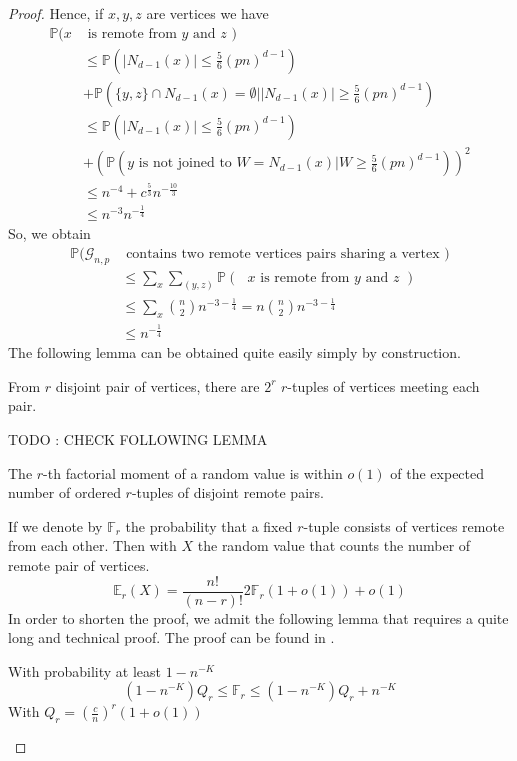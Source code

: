 \begin{proof}
	Hence, if $x, y, z$ are vertices we have
	\begin{align}
		\mathbb{P}(x&\text{ is remote from $y$ and $z$ }) 						\\	
		&\leq \mathbb{P}(|N_{d-1}(x)|\leq \frac{5}{6} (pn)^{d-1}) 					\\
		&+\mathbb{P}(\{y, z\} \cap N_{d-1}(x) = \emptyset | |N_{d-1}(x)| \geq \frac{5}{6}(pn)^{d-1} )	\\
		&\leq \mathbb{P}(|N_{d-1}(x)|\leq \frac{5}{6} (pn)^{d-1}) 					\\				
		&+(\mathbb{P}(\text{$y$ is not joined to } W = N_{d-1}(x) | W \geq \frac{5}{6} (pn)^{d-1}))^2	\\
		&\leq n^{-4} + c^{\frac{5}{3}}n^{-\frac{10}{3}}							\\
		&\leq n^{-3}n^{-\frac{1}{4}}
	\end{align}
	So, we obtain
	\begin{align}
		\mathbb{P}(\mathcal{G}_{n, p} &\text{ contains two remote vertices pairs sharing a vertex })	\\
			&\leq \sum_x\sum_{(y, z)}\mathbb{P}(\text{ $x$ is remote from $y$ and $z$ })		\\
			&\leq \sum_x \binom{n}{2}n^{-3-\frac{1}{4}} = n\binom{n}{2}n^{-3-\frac{1}{4}}		\\
			&\leq n^{-\frac{1}{4}}
	\end{align}
	The following lemma can be obtained quite easily simply by construction.
	\begin{lemma}
		From $r$ disjoint pair of vertices, there are $2^r$ $r$-tuples of vertices meeting each pair.
	\end{lemma}
	TODO : CHECK FOLLOWING LEMMA
	\begin{lemma}
		The $r$-th factorial moment of a random value is within $o(1)$ of the expected number of ordered $r$-tuples of disjoint remote pairs.
	\end{lemma}
	If we denote by $\mathbb{F}_r$ the probability that a fixed $r$-tuple consists of vertices remote from each other.
	Then with $X$ the random value that counts the number of remote pair of vertices.
	\begin{equation}
		\mathbb{E}_r(X) = \frac{n!}{(n-r)!}2\mathbb{F}_r(1+o(1)) + o(1)
	\end{equation}
	In order to shorten the proof, we admit the following lemma that requires a quite long and technical proof. The proof can be found in \cite{Bollob81}.
	\begin{lemma}
		With probability at least $1-n^{-K}$
		\begin{equation}
			(1-n^{-K})Q_r \leq \mathbb{F}_r \leq (1-n^{-K}) Q_r + n^{-K}
		\end{equation}
		With $Q_r = (\frac{c}{n})^r(1+o(1))$
	\end{lemma}


\end{proof}
